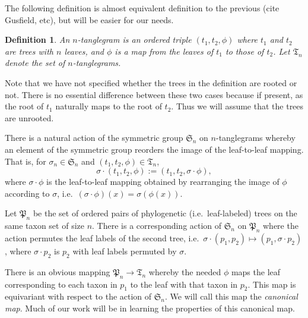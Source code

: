 \documentclass{amsart}
\newtheorem{definition}[theorem]{Definition}
\newcommand{\fS}{\mathfrak S}
\newcommand{\fT}{\mathfrak T}
\newcommand{\fP}{\mathfrak P}
\begin{document}
The following definition is almost equivalent definition to the previous (cite Gusfield, etc), but will be easier for our needs.
\begin{definition}
An $n$-\textit{tanglegram} is an ordered triple $(t_1, t_2, \phi)$ where $t_1$ and $t_2$ are trees with $n$ leaves, and $\phi$ is a map from the leaves of $t_1$ to those of $t_2$.
Let $\fT_n$ denote the set of $n$-tanglegrams.
\end{definition}
Note that we have not specified whether the trees in the definition are rooted or not.
There is no essential difference between these two cases because if present, as the root of $t_1$ naturally maps to the root of $t_2$.
Thus we will assume that the trees are unrooted.

There is a natural action of the symmetric group $\fS_n$ on $n$-tanglegrams whereby an element of the symmetric group reorders the image of the leaf-to-leaf mapping.
That is, for $\sigma_n \in \fS_n$ and $(t_1, t_2, \phi) \in \fT_n$,
\[
\sigma \cdot (t_1, t_2, \phi) := (t_1, t_2, \sigma \cdot \phi),
\]
where $\sigma \cdot \phi$ is the leaf-to-leaf mapping obtained by rearranging the image of $\phi$ according to $\sigma$, i.e.\ $(\sigma \cdot \phi)(x) = \sigma(\phi(x))$.

Let $\fP_n$ be the set of ordered pairs of phylogenetic (i.e.\ leaf-labeled) trees on the same taxon set of size $n$.
There is a corresponding action of $\fS_n$ on $\fP_n$ where the action permutes the leaf labels of the second tree, i.e.\ $\sigma \cdot (p_1, p_2) \mapsto (p_1, \sigma \cdot p_2)$, where $\sigma \cdot p_2$ is $p_2$ with leaf labels permuted by $\sigma$.

There is an obvious mapping $\fP_n \rightarrow \fT_n$ whereby the needed $\phi$ maps the leaf corresponding to each taxon in $p_1$ to the leaf with that taxon in $p_2$.
This map is equivariant with respect to the action of $\fS_n$.
We will call this map the \textit{canonical map}.
Much of our work will be in learning the properties of this canonical map.


% 
% 
\end{document}
